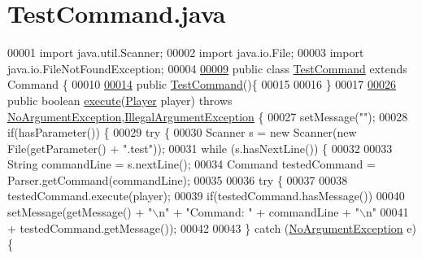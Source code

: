 \hypertarget{TestCommand_8java_source}{\section{Test\-Command.\-java}
}

\begin{DoxyCode}
00001 \textcolor{keyword}{import} java.util.Scanner;
00002 \textcolor{keyword}{import} java.io.File;
00003 \textcolor{keyword}{import} java.io.FileNotFoundException;
00004 
\hypertarget{TestCommand_8java_source_l00009}{}\hyperlink{classTestCommand}{00009} \textcolor{keyword}{public} \textcolor{keyword}{class }\hyperlink{classTestCommand}{TestCommand} \textcolor{keyword}{extends} Command \{
00010 
\hypertarget{TestCommand_8java_source_l00014}{}\hyperlink{classTestCommand_a562eaa3c455e0be709b1caa02c9044e6}{00014}     \textcolor{keyword}{public} \hyperlink{classTestCommand_a562eaa3c455e0be709b1caa02c9044e6}{TestCommand}()\{
00015 
00016     \}
00017 
\hypertarget{TestCommand_8java_source_l00026}{}\hyperlink{classTestCommand_a2c5d98451d5cedb9297caae17378de63}{00026}     \textcolor{keyword}{public} \textcolor{keywordtype}{boolean} \hyperlink{classTestCommand_a2c5d98451d5cedb9297caae17378de63}{execute}(\hyperlink{classPlayer}{Player} player) \textcolor{keywordflow}{throws} 
      \hyperlink{classNoArgumentException}{NoArgumentException},\hyperlink{classIllegalArgumentException}{IllegalArgumentException} \{
00027         setMessage(\textcolor{stringliteral}{""});
00028         \textcolor{keywordflow}{if}(hasParameter()) \{
00029             \textcolor{keywordflow}{try} \{
00030                 Scanner s = \textcolor{keyword}{new} Scanner(\textcolor{keyword}{new} File(getParameter() + \textcolor{stringliteral}{".test"}));
00031                 \textcolor{keywordflow}{while} (s.hasNextLine()) \{
00032 
00033                     String commandLine = s.nextLine();
00034                     Command testedCommand = Parser.getCommand(commandLine);
00035 
00036                     \textcolor{keywordflow}{try} \{
00037 
00038                         testedCommand.execute(player);
00039                         \textcolor{keywordflow}{if}(testedCommand.hasMessage())
00040                             setMessage(getMessage() + \textcolor{stringliteral}{"\(\backslash\)n"} + \textcolor{stringliteral}{"Command: "} + commandLine + \textcolor{stringliteral}{"\(\backslash\)n"}
00041                                     + testedCommand.getMessage());
00042 
00043                     \} \textcolor{keywordflow}{catch} (\hyperlink{classNoArgumentException}{NoArgumentException} e) \{

\end{DoxyCode}
